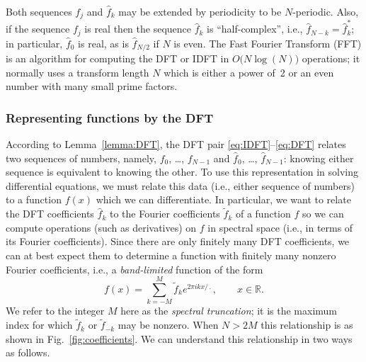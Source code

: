 \documentclass[12pt]{article}
\newcommand{\R}{\mathbb{R}}
\newcommand{\CC}[1]{{#1}^{*}}           %
\newcommand{\fc}[1]{\widetilde{#1}} %
\newcommand{\dfc}[1]{\widehat{#1}}  %
\begin{document}
Both sequences $f_j$ and $\dfc{f}_k$ may be extended by periodicity to be
$N$-periodic.  Also, if the sequence $f_j$ is real then the sequence
$\dfc{f}_k$ is ``half-complex'', i.e., $\dfc{f}_{N-k} = \CC{\dfc{f}}_k$; in
particular, $\dfc{f}_0$ is real, as is $\dfc{f}_{N/2}$ if $N$ is even.  The
Fast Fourier Transform (FFT) is an algorithm for computing the DFT or IDFT in
$O\big(N\log(N)\big)$ operations; it normally uses a transform length $N$
which is either a power of~2 or an even number with many small prime factors.

\pagebreak[1]
\subsubsection{Representing functions by the DFT}

According to Lemma~\ref{lemma:DFT}, the DFT pair
\eqref{eq:IDFT}--\eqref{eq:DFT} relates two sequences of numbers, namely,
$f_0$, \dots, $f_{N-1}$ and $\dfc{f}_0$, \dots, $\dfc{f}_{N-1}$:  knowing
either sequence is equivalent to knowing the other.  To use this
representation in solving differential equations, we must relate this data
(i.e., either sequence of numbers) to a function $f(x)$ which we can
differentiate.  In particular, we want to relate the DFT coefficients
$\dfc{f}_k$ to the Fourier coefficients $\fc{f}_k$ of a function $f$ so we can
compute operations (such as derivatives) on $f$ in spectral space (i.e., in
terms of its Fourier coefficients).
Since there are only finitely many DFT coefficients, we can at best
expect them to determine a function with finitely many nonzero Fourier
coefficients, i.e., a \emph{band-limited} function of the form
\begin{equation}
   f(x) = \sum_{k=-M}^{M} \fc{f}_k e^{2\pi ikx/\period},
\qquad x\in\R.
\label{eq:FS:truncated}
\end{equation}
We refer to the integer $M$ here as the \emph{spectral truncation}; it
is the maximum index for which $\fc{f}_{k}$ or $\fc{f}_{-k}$ may be nonzero.
When $N>2M$ this relationship is as shown in Fig.~\ref{fig:coefficients}.
We can understand this relationship in two ways as follows.
\end{document}
